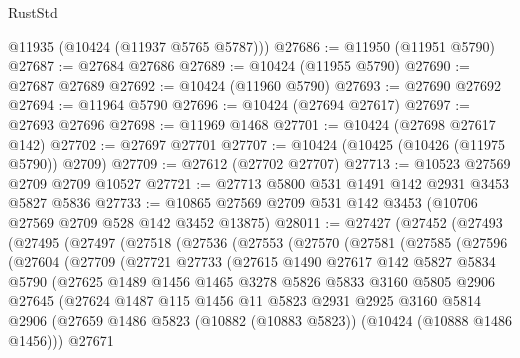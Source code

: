 \begin{lexlean}{RustStd}
\begin{coremodule}
      @11935
      (@10424 (@11937 @5765 @5787)))
@27686 := @11950 (@11951 @5790)
@27687 := @27684 @27686
@27689 := @10424 (@11955 @5790)
@27690 := @27687 @27689
@27692 := @10424 (@11960 @5790)
@27693 := @27690 @27692
@27694 := @11964 @5790
@27696 := @10424 (@27694 @27617)
@27697 := @27693 @27696
@27698 := @11969 @1468
@27701 := @10424 (@27698 @27617 @142)
@27702 := @27697 @27701
@27707 := @10424 (@10425 (@10426 (@11975 @5790)) @2709)
@27709 := @27612 (@27702 @27707)
@27713 := @10523 @27569 @2709 @2709 @10527
@27721 := @27713 @5800 @531 @1491 @142 @2931 @3453 @5827 @5836
@27733 := @10865 @27569 @2709 @531 @142 @3453 (@10706 @27569 @2709 @528 @142 @3452 @13875)
@28011 := @27427
    (@27452
      (@27493
        (@27495
          (@27497
            (@27518
              (@27536
                (@27553
                  (@27570
                    (@27581
                      (@27585
                        (@27596
                          (@27604
                            (@27709
                              (@27721
                                @27733
                                (@27615
                                  @1490
                                  @27617
                                  @142
                                  @5827
                                  @5834
                                  @5790
                                  (@27625
                                    @1489
                                    @1456
                                    @1465
                                    @3278
                                    @5826
                                    @5833
                                    @3160
                                    @5805
                                    @2906
                                    @27645
                                    (@27624
                                      @1487
                                      @115
                                      @1456
                                      @11
                                      @5823
                                      @2931
                                      @2925
                                      @3160
                                      @5814
                                      @2906
                                      (@27659
                                        @1486
                                        @5823
                                        (@10882 (@10883 @5823))
                                        (@10424 (@10888 @1486 @1456)))
                                      @27671

\end{coremodule}
\end{lexlean}
